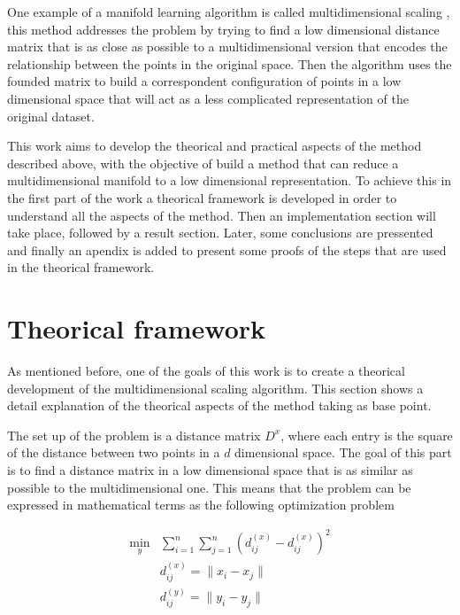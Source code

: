 \documentclass[12pt,journal]{IEEEtran}
\begin{document}
\vspace{0.5cm}

One example of a manifold learning algorithm is called multidimensional
scaling \cite{mds}, this method addresses the problem by trying to find a low
dimensional distance matrix that is as close as possible to a multidimensional
version that encodes the relationship between the points in the original space.
Then the algorithm uses the founded matrix to build a correspondent configuration
of points in a low dimensional space that will act as a less complicated
representation of the original dataset.

\vspace{0.5cm}

This work aims to develop the theorical and practical aspects of the method
described above, with the objective of build a method that can reduce a
multidimensional manifold to a low dimensional representation. To achieve this
in the first part of the work a theorical framework is developed in order to
understand all the aspects of the method. Then an implementation section will
take place, followed by a result section. Later, some conclusions are
pressented and finally an apendix is added to present some proofs of the
steps that are used in the theorical framework.

\section{Theorical framework}

    As mentioned before, one of the goals of this work is to create a theorical
    development of the multidimensional scaling algorithm. This section shows a
    detail explanation of the theorical aspects of the method taking \cite{proof}
    as base point.

    \vspace{0.5cm}

    The set up of the problem is a distance matrix $D^x$, where each
    entry is the square of the distance between two points in a $d$ dimensional
    space. The goal of this part is to find a distance matrix in a low
    dimensional space that is as similar as possible to the multidimensional one.
    This means that the problem can be expressed in mathematical terms as the
    following optimization problem

    \begin{equation*}
        \begin{aligned}
            \underset{y}{\text{min}}  & \sum_{i=1}^n \sum_{j=1}^n ( d^{(x)}_{ij} - d^{(x)}_{ij} )^2 \\
            & d_{ij}^{(x)} = \lVert x_i - x_j \rVert\\
            & d_{ij}^{(y)} = \lVert y_i - y_j \rVert
        \end{aligned}
    \end{equation*}\\
\end{document}
